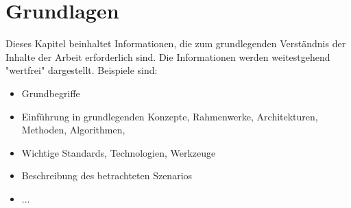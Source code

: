 \chapter{Grundlagen}
Dieses Kapitel beinhaltet Informationen, die zum grundlegenden Verständnis der Inhalte der Arbeit erforderlich sind. Die Informationen werden weitestgehend "wertfrei" dargestellt. Beispiele sind:

\begin{itemize}
	\item Grundbegriffe
	\item Einführung in grundlegenden Konzepte, Rahmenwerke, Architekturen, Methoden, Algorithmen, 
	\item Wichtige Standards, Technologien, Werkzeuge
	\item Beschreibung des betrachteten Szenarios
	\item ... 
\end{itemize}